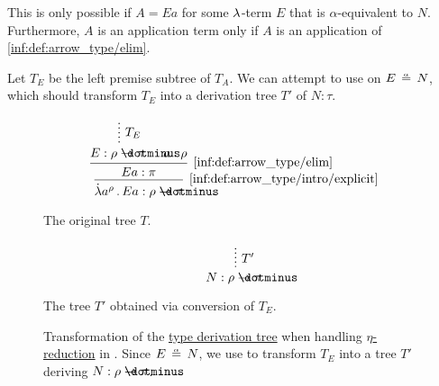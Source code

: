\begin{algorithm}
\begin{thmenum}
\begin{thmenum}
      This is only possible if \( A = Ea \) for some \( {\mathrm \lambda} \)-term \( E \) that is \( \alpha \)-equivalent to \( N \). Furthermore, \( A \) is an application term only if \( A \) is an application of \ref{inf:def:arrow_type/elim}.

      Let \( T_E \) be the left premise subtree of \( T_A \). We can attempt to use  on \( E \aequiv N \), which should transform \( T_E \) into a derivation tree \( T' \) of \( N: \tau \).

      \begin{figure}[!ht]
        \hfill
        \hfill
        \begin{subcaptionblock}{0.45\textwidth}
          \begin{equation*}
            \begin{prooftree}
              \hypo{ }
              \ellipsis { \( T_E \) } { E: \rho \synimplies \pi }

              \hypo { a: \rho }
              \infer2[\ref{inf:def:arrow_type/elim}]{ E a: \pi }.

              \infer1[\ref{inf:def:arrow_type/intro/explicit}]{ \qabs {a^\rho} E a: \rho \synimplies \pi }.
            \end{prooftree}
          \end{equation*}
          \caption{The original tree \( T \).}
        \end{subcaptionblock}
        \hfill
        \begin{subcaptionblock}{0.45\textwidth}
          \begin{equation*}
            \begin{prooftree}
              \hypo{ }
              \ellipsis { \( T' \) } { N: \rho \synimplies \pi }
            \end{prooftree}
          \end{equation*}
          \caption{The tree \( T' \) obtained via conversion of \( T_E \).}
        \end{subcaptionblock}
        \hfill
        \caption{Transformation of the \hyperref[def:type_derivation_tree]{type derivation tree} when handling \hyperref[def:beta_eta_reduction]{\( \eta \)-reduction} in . Since \( E \aequiv N \), we use  to transform \( T_E \) into a tree \( T' \) deriving \( N: \rho \synimplies \pi \).}\label{fig:alg:simply_typed_reduction/arrow_intro/eta}
      \end{figure}


\end{thmenum}
\end{thmenum}
\end{algorithm}
